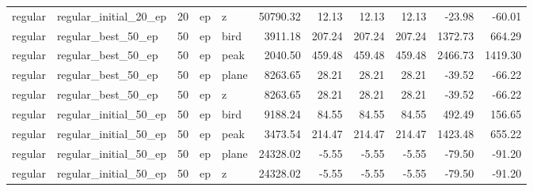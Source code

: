 \begin{tabular}{llrllrrrrrr}
regular & regular_initial_20_ep & 20 & ep & z & 50790.32 & 12.13 & 12.13 & 12.13 & -23.98 & -60.01 \\
regular & regular_best_50_ep & 50 & ep & bird & 3911.18 & 207.24 & 207.24 & 207.24 & 1372.73 & 664.29 \\
regular & regular_best_50_ep & 50 & ep & peak & 2040.50 & 459.48 & 459.48 & 459.48 & 2466.73 & 1419.30 \\
regular & regular_best_50_ep & 50 & ep & plane & 8263.65 & 28.21 & 28.21 & 28.21 & -39.52 & -66.22 \\
regular & regular_best_50_ep & 50 & ep & z & 8263.65 & 28.21 & 28.21 & 28.21 & -39.52 & -66.22 \\
regular & regular_initial_50_ep & 50 & ep & bird & 9188.24 & 84.55 & 84.55 & 84.55 & 492.49 & 156.65 \\
regular & regular_initial_50_ep & 50 & ep & peak & 3473.54 & 214.47 & 214.47 & 214.47 & 1423.48 & 655.22 \\
regular & regular_initial_50_ep & 50 & ep & plane & 24328.02 & -5.55 & -5.55 & -5.55 & -79.50 & -91.20 \\
regular & regular_initial_50_ep & 50 & ep & z & 24328.02 & -5.55 & -5.55 & -5.55 & -79.50 & -91.20 \\
\bottomrule
\end{tabular}
